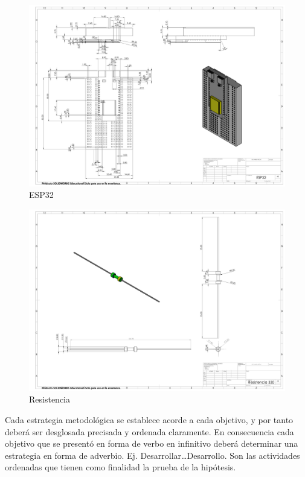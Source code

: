     \begin{figure}[H]
        \centering
        \includegraphics[trim = {10mm 10mm 10mm 10mm},clip,scale=0.120]{24/Img/ESP32.pdf}
        \caption{ESP32}
        \label{fig:ESP32}
    \end{figure}
    \begin{figure}[H]
        \centering
        \includegraphics[trim = {10mm 10mm 10mm 10mm},clip,scale=0.120]{24/Img/Resistencia.pdf}
        \caption{Resistencia}
        \label{fig:Resistencia}
    \end{figure}
    Cada estrategia metodológica se establece acorde a cada objetivo, y por tanto deberá ser desglosada precisada y ordenada claramente. En consecuencia cada objetivo que se presentó en forma de verbo en infinitivo deberá determinar una estrategia en forma de adverbio. Ej. Desarrollar…Desarrollo. Son las actividades ordenadas que tienen como finalidad la prueba de la hipótesis. 
    
